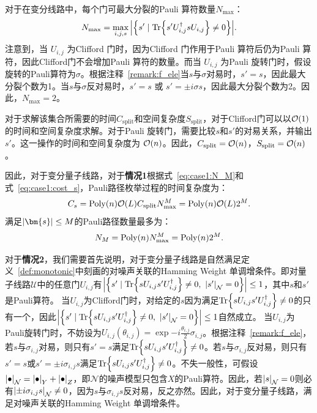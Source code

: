 对于在变分线路中，每个门可最大分裂的Pauli 算符数量$N_{\max}$：
\begin{equation}
    N_{\text{max}} = \max_{i,j,s}\abs{ \left\{ s'\mid \Tr{s' U^\dagger_{i,j}s U_{i,j}}\neq 0 \right\}}.
\end{equation}
注意到，当 $U_{i,j}$ 为Clifford 门时，因为Clifford 门作用于Pauli 算符后仍为Pauli 算符，因此Clifford门不会增加Pauli 算符的数量。而当 $U_{i,j}$ 为Pauli 旋转门时，假设旋转的Pauli算符为$\sigma$。根据注释~\ref{remark:f_ele}当$s$与$\sigma$对易时，$s'=s$，因此最大分裂个数为1。当$s$与$\sigma$反对易时，$s'=s$ 或 $s'=\pm i \sigma s$，因此最大分裂个数为2。因此，$N_{\text{max}}=2$。

对于求解该集合所需要的时间$C_{\text{split}}$和空间复杂度$S_{\text{split}}$，对于Clifford门可以以$\order{1}$的时间和空间复杂度求解。对于Pauli 旋转门，需要比较$s$和$s'$的对易关系，并输出$s'$。这一操作的时间和空间复杂度为 $\order{n}$。因此，$C_{\text{split}}=\order{n}$，$S_{\text{split}}=\order{n}$。

因此，对于变分量子线路，对于\textbf{情况1}根据式~\eqref{eq:case1:N_M}和式~\eqref{eq:case1:cost_s}，Pauli路径枚举过程的时间复杂度为：
\begin{equation}
    C_{s}=\mathrm{Poly}(n) \order{L} C_{\text{split}} N_{\text{max}}^{M}= \mathrm{Poly}(n) \order{L} 2^M.
\end{equation}
满足$\abs{\bm{s}}\leq M$的Pauli路径数量最多为：
\begin{equation}\label{eq:vqa:case1:N_M}
    N_M=\text{Poly}(n) N_{\text{max}}^{M}=\text{Poly}(n) 2^M.
\end{equation}


对于\textbf{情况2}，我们需要首先说明，对于变分量子线路是自然满足定义~\ref{def:monotonic}中刻画的对噪声关联的Hamming Weight 单调增条件。即对量子线路$\mathcal{U}$中的任意门$U_{i,j}$有$\abs{\left\{s'\mid \Tr{sU_{i,j}s' U_{i,j}^\dagger}\neq 0,\ \abs{s'}_{\mathcal{N}}=0\right\}}\leq 1$，其中$s$和$s'$是Pauli算符。
当$U_{i,j}$为Clifford门时，对给定的$s$因为满足$\Tr{sU_{i,j}s' U_{i,j}^\dagger}\neq 0$的只有一个，因此$\abs{\left\{s'\mid \Tr{sU_{i,j}s' U_{i,j}^\dagger}\neq 0,\ \abs{s'}_{\mathcal{N}}=0\right\}}\leq 1$自然成立。
当$U_{i,j}$为Pauli旋转门时，不妨设为$U_{i,j}(\theta_{i,j})=\exp{-i \frac{\theta_{i,j}}{2} \sigma_{i,j}}$。根据注释~\ref{remark:f_ele}，若$s$与$\sigma_{i,j}$对易，则只有$s'=s$满足$\Tr{sU_{i,j}s' U_{i,j}^\dagger}\neq 0$。若$s$与$\sigma_{i,j}$反对易，则只有$s'=s$或$s'=\pm i \sigma_{i,j}s$满足$\Tr{sU_{i,j}s' U_{i,j}^\dagger}\neq 0$。不失一般性，可假设$\abs{\bullet}_{\mathcal{N}}=\abs{\bullet}_Y+\abs{\bullet}_Z$，即$\mathcal{N}$的噪声模型只包含$X$的Pauli算符。因此，若$\abs{s}_{\mathcal{N}}=0$则必有$\abs{\pm i \sigma_{i,j}s}_{\mathcal{N}}\neq 0$，因为$s$与$\sigma_{i,j}s$反对易，反之亦然。因此，对于变分量子线路，满足对噪声关联的Hamming Weight 单调增条件。


